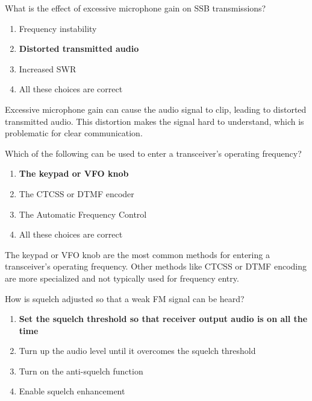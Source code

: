 \begin{tcolorbox}[colback=gray!10!white,colframe=black!75!black,title={T4B01}]
    What is the effect of excessive microphone gain on SSB transmissions?
    \begin{enumerate}[label=\Alph*),noitemsep]
        \item Frequency instability
        \item \textbf{Distorted transmitted audio}
        \item Increased SWR
        \item All these choices are correct
    \end{enumerate}
\end{tcolorbox}

Excessive microphone gain can cause the audio signal to clip, leading to distorted transmitted audio. This distortion makes the signal hard to understand, which is problematic for clear communication.

\begin{tcolorbox}[colback=gray!10!white,colframe=black!75!black,title={T4B02}]
    Which of the following can be used to enter a transceiver’s operating frequency?
    \begin{enumerate}[label=\Alph*),noitemsep]
        \item \textbf{The keypad or VFO knob}
        \item The CTCSS or DTMF encoder
        \item The Automatic Frequency Control
        \item All these choices are correct
    \end{enumerate}
\end{tcolorbox}

The keypad or VFO knob are the most common methods for entering a transceiver’s operating frequency. Other methods like CTCSS or DTMF encoding are more specialized and not typically used for frequency entry.

\begin{tcolorbox}[colback=gray!10!white,colframe=black!75!black,title={T4B03}]
    How is squelch adjusted so that a weak FM signal can be heard?
    \begin{enumerate}[label=\Alph*),noitemsep]
        \item \textbf{Set the squelch threshold so that receiver output audio is on all the time}
        \item Turn up the audio level until it overcomes the squelch threshold
        \item Turn on the anti-squelch function
        \item Enable squelch enhancement
    \end{enumerate}
\end{tcolorbox}


